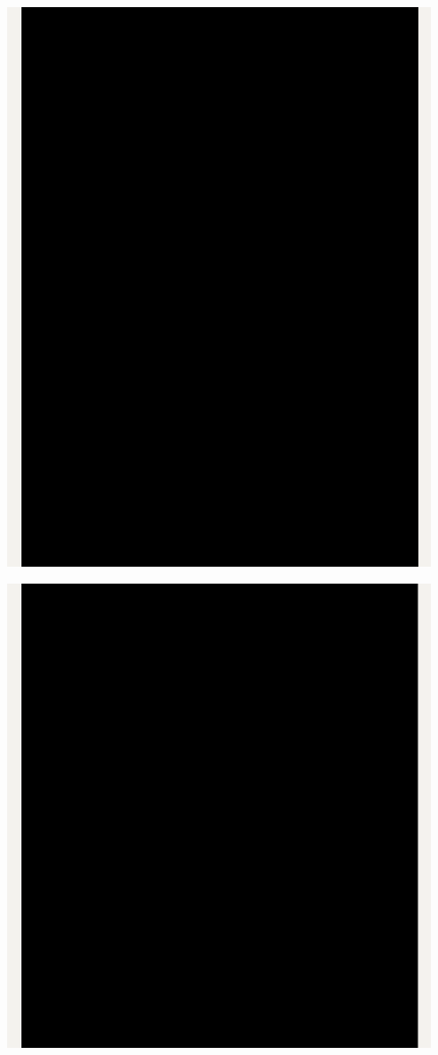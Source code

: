 \Continuing
\begin{center}
    \includegraphics[width=34em]{php-two-linkedin-p2_public}
\end{center}
\WillContinue
\pagebreak

\Continuing
\begin{center}
    \includegraphics[width=34em]{php-two-linkedin-p3_public}
\end{center}

\pagebreak
